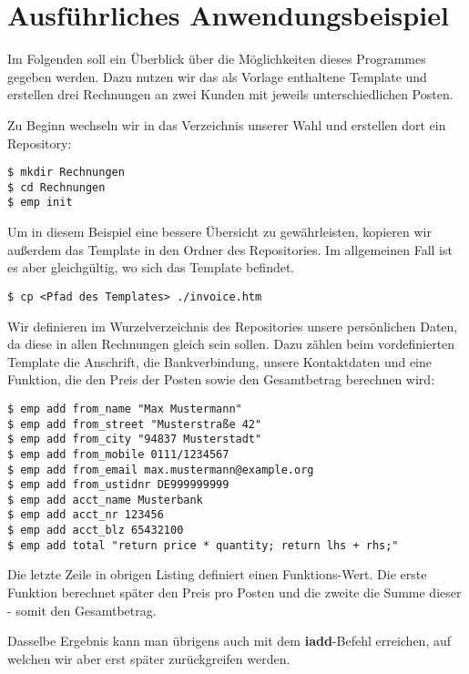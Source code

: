 

\section{Ausführliches Anwendungsbeispiel}
Im Folgenden soll ein Überblick über die Möglichkeiten dieses Programmes gegeben werden. Dazu nutzen wir das als Vorlage enthaltene Template und erstellen drei Rechnungen an zwei Kunden mit jeweils unterschiedlichen Posten.

Zu Beginn wechseln wir in das Verzeichnis unserer Wahl und erstellen dort ein Repository:
\begin{lstlisting}[style=Bash]
$ mkdir Rechnungen
$ cd Rechnungen
$ emp init
\end{lstlisting}

Um in diesem Beispiel eine bessere Übersicht zu gewährleisten, kopieren wir außerdem das Template in den Ordner des Repositories. Im allgemeinen Fall ist es aber gleichgültig, wo sich das Template befindet.
\begin{lstlisting}[style=Bash]
$ cp <Pfad des Templates> ./invoice.htm
\end{lstlisting}


Wir definieren im Wurzelverzeichnis des Repositories unsere persönlichen Daten, da diese in allen Rechnungen gleich sein sollen. Dazu zählen beim vordefinierten Template die Anschrift, die Bankverbindung, unsere Kontaktdaten und eine Funktion, die den Preis der Posten sowie den Gesamtbetrag berechnen wird:

\begin{lstlisting}[style=Bash]
$ emp add from_name "Max Mustermann"
$ emp add from_street "Musterstraße 42"
$ emp add from_city "94837 Musterstadt"
$ emp add from_mobile 0111/1234567
$ emp add from_email max.mustermann@example.org
$ emp add from_ustidnr DE999999999
$ emp add acct_name Musterbank
$ emp add acct_nr 123456
$ emp add acct_blz 65432100
$ emp add total "return price * quantity; return lhs + rhs;"
\end{lstlisting}

Die letzte Zeile in obrigen Listing definiert einen Funktions-Wert. Die erste Funktion berechnet später den Preis pro Posten und die zweite die Summe dieser - somit den Gesamtbetrag.\vspace{0.5em}

Dasselbe Ergebnis kann man übrigens auch mit dem \textbf{iadd}-Befehl erreichen, auf welchen wir aber erst später zurückgreifen werden.
\vspace{0.5em}

